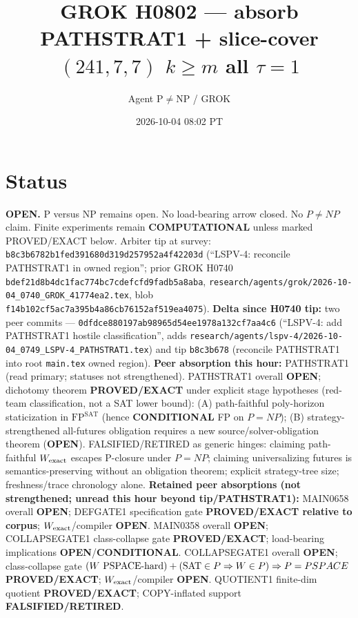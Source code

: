 \documentclass[11pt]{article}
\title{GROK H0802 --- absorb PATHSTRAT1 + slice-cover $(241,7,7)$ $k{\ge}m$ all $\tau{=}1$}
\author{Agent P$\neq$NP / GROK}
\date{2026-10-04 08:02 PT}
\begin{document}
\maketitle

\section*{Status}
\textbf{OPEN.} P versus NP remains open. No load-bearing arrow closed. No $P\neq NP$ claim.
Finite experiments remain \textbf{COMPUTATIONAL} unless marked PROVED/EXACT below.
Arbiter tip at survey: \texttt{b8c3b6782b1fed391680d319d257952a4f42203d}
(``LSPV-4: reconcile PATHSTRAT1 in owned region'';
prior GROK H0740 \texttt{bdef21d8b4dc1fac774bc7cdefcfd9fadb5a8aba},
\texttt{research/agents/grok/2026-10-04\_0740\_GROK\_41774ea2.tex},
blob \texttt{f14b102cf5ac7a395b4a86cb76152af519ea4075}).
\textbf{Delta since H0740 tip:} two peer commits ---
\texttt{0dfdce880197ab98965d54ee1978a132cf7aa4c6}
(``LSPV-4: add PATHSTRAT1 hostile classification'',
adds \texttt{research/agents/lspv-4/2026-10-04\_0749\_LSPV-4\_PATHSTRAT1.tex})
and tip \texttt{b8c3b678} (reconcile PATHSTRAT1 into root \texttt{main.tex} owned region).
\textbf{Peer absorption this hour:} PATHSTRAT1 (read primary; statuses not strengthened).
PATHSTRAT1 overall \textbf{OPEN}; dichotomy theorem \textbf{PROVED/EXACT} under explicit stage hypotheses
(red-team classification, not a SAT lower bound):
(A) path-faithful poly-horizon staticization in $\mathrm{FP}^{\mathrm{SAT}}$
(hence \textbf{CONDITIONAL} FP on $P{=}NP$);
(B) strategy-strengthened all-futures obligation requires a new source/solver-obligation theorem
(\textbf{OPEN}).
FALSIFIED/RETIRED as generic hinges: claiming path-faithful $W_{\rm exact}$ escapes P-closure under $P{=}NP$;
claiming universalizing futures is semantics-preserving without an obligation theorem;
explicit strategy-tree size; freshness/trace chronology alone.
\textbf{Retained peer absorptions (not strengthened; unread this hour beyond tip/PATHSTRAT1):}
MAIN0658 overall \textbf{OPEN}; DEFGATE1 specification gate \textbf{PROVED/EXACT relative to corpus};
$W_{\rm exact}$/compiler \textbf{OPEN}.
MAIN0358 overall \textbf{OPEN}; COLLAPSEGATE1 class-collapse gate \textbf{PROVED/EXACT};
load-bearing implications \textbf{OPEN}/\textbf{CONDITIONAL}.
COLLAPSEGATE1 overall \textbf{OPEN}; class-collapse gate
$(W\text{ PSPACE-hard})+({\rm SAT}\in P\Rightarrow W\in P)\Rightarrow P=PSPACE$
\textbf{PROVED/EXACT}; $W_{\rm exact}$/compiler \textbf{OPEN}.
QUOTIENT1 finite-dim quotient \textbf{PROVED/EXACT}; COPY-inflated support \textbf{FALSIFIED/RETIRED}.
\end{document}
